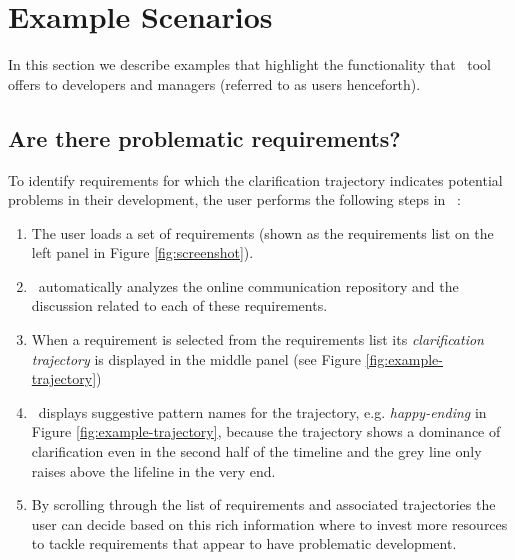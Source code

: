 \section{Example Scenarios}
In this section we describe examples that highlight the functionality that \viss\ tool offers to developers and managers (referred to as users henceforth).

\subsection{Are there problematic requirements?}
To identify requirements for which the clarification trajectory indicates potential problems in their development, the user performs the following steps in \viss\ :

\begin{enumerate}
\item The user loads a set of requirements (shown as the requirements list on the left panel in Figure \ref{fig:screenshot}).
\item \viss\ automatically analyzes the online communication repository and the discussion related to each of these requirements.  
\item When a requirement is selected from the requirements list its \emph{clarification trajectory} is displayed in the middle panel (see Figure \ref{fig:example-trajectory})
\item \viss\ displays suggestive pattern names for the trajectory, e.g. \emph{happy-ending} in Figure \ref{fig:example-trajectory}, because the trajectory shows a dominance of clarification even in the second half of the timeline and the grey line only raises above the lifeline in the very end.
\item By scrolling through the list of requirements and associated trajectories the user can decide based on this rich information where to invest more resources to tackle requirements that appear to have problematic development.
\end{enumerate}


